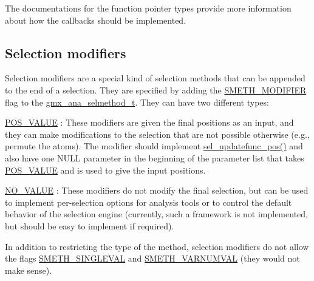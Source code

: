 \-The documentations for the function pointer types provide more information about how the callbacks should be implemented.\hypertarget{selmethods_selmethods_modifiers}{}\subsection{\-Selection modifiers}\label{selmethods_selmethods_modifiers}
\-Selection modifiers are a special kind of selection methods that can be appended to the end of a selection. \-They are specified by adding the \hyperlink{share_2template_2gromacs_2selmethod_8h_aa5b18df47b72690889afd89f5e68694c}{\-S\-M\-E\-T\-H\-\_\-\-M\-O\-D\-I\-F\-I\-E\-R} flag to the {\ttfamily \hyperlink{structgmx__ana__selmethod__t}{gmx\-\_\-ana\-\_\-selmethod\-\_\-t}}. \-They can have two different types\-:
\begin{DoxyItemize}
\item \hyperlink{share_2template_2gromacs_2selvalue_8h_a70b42b87d434580bf1493591857b8beca31a47fbfbc85ad1472ce3d2a168fd1ec}{\-P\-O\-S\-\_\-\-V\-A\-L\-U\-E} \-: \-These modifiers are given the final positions as an input, and they can make modifications to the selection that are not possible otherwise (e.\-g., permute the atoms). \-The modifier should implement \hyperlink{include_2selmethod_8h_a47bfb381e8df48bddd7ca78abff224bf}{sel\-\_\-updatefunc\-\_\-pos()} and also have one \-N\-U\-L\-L parameter in the beginning of the parameter list that takes \hyperlink{share_2template_2gromacs_2selvalue_8h_a70b42b87d434580bf1493591857b8beca31a47fbfbc85ad1472ce3d2a168fd1ec}{\-P\-O\-S\-\_\-\-V\-A\-L\-U\-E} and is used to give the input positions.
\item \hyperlink{share_2template_2gromacs_2selvalue_8h_a70b42b87d434580bf1493591857b8beca4d694119ce83b62d74ff06b5e017dca8}{\-N\-O\-\_\-\-V\-A\-L\-U\-E} \-: \-These modifiers do not modify the final selection, but can be used to implement per-\/selection options for analysis tools or to control the default behavior of the selection engine (currently, such a framework is not implemented, but should be easy to implement if required).
\end{DoxyItemize}

\-In addition to restricting the type of the method, selection modifiers do not allow the flags \hyperlink{share_2template_2gromacs_2selmethod_8h_a2de9fc1fca93570388059f72b064df08}{\-S\-M\-E\-T\-H\-\_\-\-S\-I\-N\-G\-L\-E\-V\-A\-L} and \hyperlink{share_2template_2gromacs_2selmethod_8h_ae0aa6a1bbb99ba5f0f6228c4cd401e0a}{\-S\-M\-E\-T\-H\-\_\-\-V\-A\-R\-N\-U\-M\-V\-A\-L} (they would not make sense).

